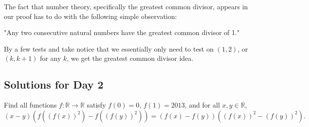 \documentclass[11pt]{article}
\theoremstyle{definition}
\begin{document}
        \begin{remark}
            The fact that number theory, specifically the greatest common divisor, appears in our proof has to do with the following simple observation:
            \begin{center}
                "Any two consecutive natural numbers have the greatest common divisor of 1."
            \end{center}
            By a few tests and take notice that we essentially only need to test on \((1,2)\), or \((k,k+1)\) for any \(k\), we get the greatest common divisor idea.
        \end{remark}

    \newpage

    \subsection{Solutions for Day 2}

        \begin{problem}
            Find all functions \(f: \mathbb{R} \to \mathbb{R}\) satisfy \(f(0) = 0\), \(f(1) = 2013\), and for all \(x,y \in \mathbb{R}\),
            \begin{equation}
                (x - y)\left(f\left(\left(f(x)\right)^2\right) - f\left(\left(f(y)\right)^2\right)\right) = \left(f(x) - f(y)\right)\left(\left(f(x)\right)^2 - \left(f(y)\right)^2\right).
                \label{e:3}
            \end{equation}
        \end{problem}
\end{document}
